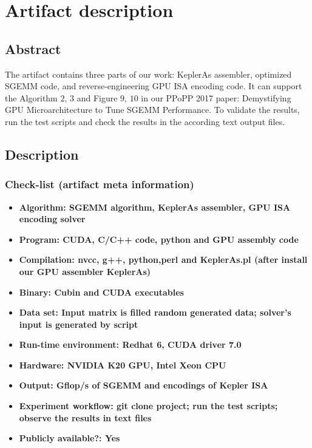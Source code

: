 \section{Artifact description}


\subsection{Abstract}

The artifact contains three parts of our work: KeplerAs assembler, optimized SGEMM code, and reverse-engineering GPU ISA encoding code. It can support the Algorithm $2$, $3$ and Figure $9$, $10$ in our PPoPP 2017 paper: Demystifying GPU Microarchitecture to Tune SGEMM Performance. To validate the results, run the test scripts and check the results in the according text output files.

\subsection{Description}

\subsubsection{Check-list (artifact meta information)}

{\small
\begin{itemize}
  \item {\bf Algorithm: SGEMM algorithm, KeplerAs assembler, GPU ISA encoding solver}
  \item {\bf Program: CUDA, C/C++ code, python and GPU assembly code}
  \item {\bf Compilation: nvcc, g++, python,perl and KeplerAs.pl (after install our GPU assembler KeplerAs)}
  \item {\bf Binary: Cubin and CUDA executables}
  \item {\bf Data set: Input matrix is filled random generated data; solver's input is generated by script}
  \item {\bf Run-time environment: Redhat 6, CUDA driver 7.0}
  \item {\bf Hardware: NVIDIA K20 GPU, Intel Xeon CPU}
  \item {\bf Output: Gflop/s of SGEMM and encodings of Kepler ISA}
  \item {\bf Experiment workflow: git clone project; run the test scripts; observe the results in text files}
  \item {\bf Publicly available?: Yes }
\end{itemize}
}

